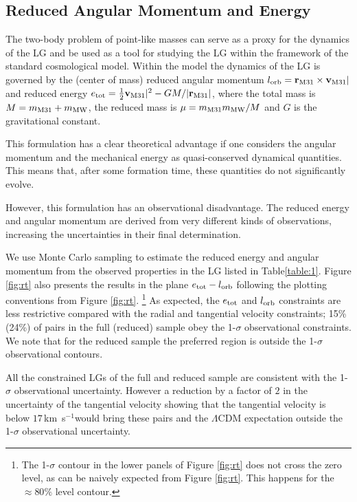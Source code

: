 \documentclass{emulateapj}
\newcommand{\kms}{\,km~s$^{-1}$}
\begin{document}
\subsection{Reduced Angular Momentum and Energy}
\label{subsection:e-l}

The two-body problem of point-like masses can serve as a proxy for the
dynamics of the LG and be used as a tool for  studying the LG within
the framework of the standard cosmological model. Within the model the
dynamics of the LG is governed by the (center of mass)  reduced
angular momentum $l_{\rm orb}= {{\bf r}_{\rm M31}}\times{\bf v}_{\rm M31}|$ and
reduced energy  $e_{\rm tot}=\frac{1}{2} {\bf v}_{\rm M31}|^2 - G M/|{\bf
  r}_{\rm M31}|$,  where the total mass is $M=m_{\rm M31}+m_{\rm MW}$,
the reduced mass is $\mu=m_{\rm M31}m_{\rm MW}/M$ and $G$ is the
gravitational constant.  


This formulation has a clear theoretical advantage if one considers
the angular momentum and the mechanical energy as quasi-conserved
dynamical quantities. This means that, after some formation time,
these quantities do not significantly evolve.


However, this formulation has an observational disadvantage. The
reduced energy and angular momentum are derived from very different
kinds of observations, increasing the uncertainties in their final
determination.  

We use Monte Carlo sampling to estimate the reduced energy and angular
momentum from the observed properties in the LG listed in
Table\ref{table:1}. Figure \ref{fig:rt} also presents the results in the
plane $e_{\rm tot}-l_{\rm orb}$ following the   plotting conventions from
Figure \ref{fig:rt}. \footnote{The  1-$\sigma$ contour in the lower
  panels of Figure \ref{fig:rt}
does not cross the zero level, as can be naively expected from Figure
\ref{fig:rt}. This happens for the $\approx 80\%$ level
contour.}  As expected, the $e_{\rm tot}$  and $l_{\rm orb}$
constraints are less restrictive compared with the radial and
tangential velocity constraints; 15\% (24\%) of pairs in the full
(reduced) sample obey the 1-$\sigma$ observational constraints.
We note that for the reduced sample the preferred region is outside the
1-$\sigma$ observational contours.

All the constrained LGs of the full and reduced sample are
consistent with the 1-$\sigma$ observational uncertainty.  However a
reduction by a factor of $2$ in the uncertainty of the tangential
velocity showing that the tangential velocity is below $17$\kms would
bring these pairs and the $\Lambda$CDM expectation outside the
1-$\sigma$ observational uncertainty.  
\end{document}
